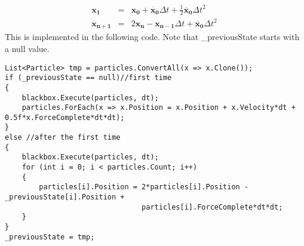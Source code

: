 \begin{eqnarray*}
\boldsymbol{x_1} &=& \boldsymbol{x_0} + \boldsymbol{\dot{x_0}}\Delta t + \frac{1}{2} \boldsymbol{\ddot{x_0}}\Delta t^2 \\
\boldsymbol{x_{n+1}} &=& 2\boldsymbol{x_n} - \boldsymbol{x_{n-1}}\Delta t + \boldsymbol{\ddot{x_0}}\Delta t^2 \
\end{eqnarray*}
This is implemented in the following code. Note that \_previousState starts with a null value.
\begin{lstlisting}
List<Particle> tmp = particles.ConvertAll(x => x.Clone());
if (_previousState == null)//first time
{
	blackbox.Execute(particles, dt);
	particles.ForEach(x => x.Position = x.Position + x.Velocity*dt + 0.5f*x.ForceComplete*dt*dt);
}
else //after the first time
{
	blackbox.Execute(particles, dt);
	for (int i = 0; i < particles.Count; i++)
	{
		particles[i].Position = 2*particles[i].Position - _previousState[i].Position +
		                        particles[i].ForceComplete*dt*dt;
	}
}
_previousState = tmp;
\end{lstlisting}
